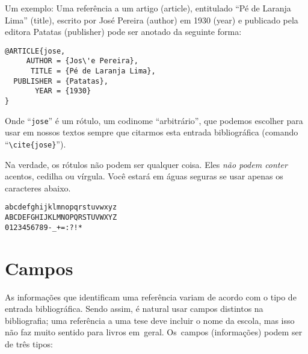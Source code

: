 \documentclass[article,openany]{memoir}
\begin{document}
Um exemplo: Uma referência a um artigo (article), entitulado ``Pé de
Laranja Lima'' (title), escrito por José Pereira (author) em 1930
(year) e publicado pela editora Patatas (publisher) pode ser anotado da
seguinte forma:

\begin{verbatim}
@ARTICLE{jose,
     AUTHOR = {Jos\'e Pereira},
      TITLE = {Pé de Laranja Lima},
  PUBLISHER = {Patatas},
       YEAR = {1930}
}
\end{verbatim}

Onde ``\verb/jose/'' é um rótulo, um codinome ``arbitrário'', que
podemos escolher para usar em nossos textos sempre que citarmos esta
entrada bibliográfica (comando ``\verb/\cite{jose}/'').

Na verdade, os rótulos não podem ser qualquer coisa. Eles \emph{não
podem conter} acentos, cedilha ou vírgula. Você estará em águas
seguras se usar apenas os caracteres abaixo.

\begin{verbatim}
abcdefghijklmnopqrstuvwxyz
ABCDEFGHIJKLMNOPQRSTUVWXYZ
0123456789-_+=:?!*
\end{verbatim}

\chapter{Campos}

As informações que identificam uma referência variam de acordo com o
tipo de entrada bibliográfica. Sendo assim, é natural usar campos
distintos na bibliografia; uma referência a uma tese deve incluir
o nome da escola, mas isso não faz muito sentido para
livros em~geral. Os~campos (informações) podem ser de três tipos:
\end{document}
